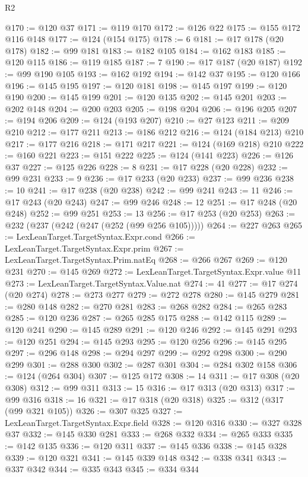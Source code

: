 \begin{lexlean}{R2}
\begin{coremodule}
@170 := @120 @37
@171 := @119 @170
@172 := @126 @22
@175 := @155 @172 @116 @148
@177 := @124 (@154 @175)
@178 := 6
@181 := @17 @178 (@20 @178)
@182 := @99 @181
@183 := @182 @105
@184 := @162 @183
@185 := @120 @115
@186 := @119 @185
@187 := 7
@190 := @17 @187 (@20 @187)
@192 := @99 @190 @105
@193 := @162 @192
@194 := @142 @37
@195 := @120 @166
@196 := @145 @195
@197 := @120 @181
@198 := @145 @197
@199 := @120 @190
@200 := @145 @199
@201 := @120 @135
@202 := @145 @201
@203 := @202 @148
@204 := @200 @203
@205 := @198 @204
@206 := @196 @205
@207 := @194 @206
@209 := @124 (@193 @207)
@210 := @27 @123
@211 := @209 @210
@212 := @177 @211
@213 := @186 @212
@216 := @124 (@184 @213) @210
@217 := @177 @216
@218 := @171 @217
@221 := @124 (@169 @218) @210
@222 := @160 @221
@223 := @151 @222
@225 := @124 (@141 @223)
@226 := @126 @37
@227 := @125 @226
@228 := 8
@231 := @17 @228 (@20 @228)
@232 := @99 @231
@233 := 9
@236 := @17 @233 (@20 @233)
@237 := @99 @236
@238 := 10
@241 := @17 @238 (@20 @238)
@242 := @99 @241
@243 := 11
@246 := @17 @243 (@20 @243)
@247 := @99 @246
@248 := 12
@251 := @17 @248 (@20 @248)
@252 := @99 @251
@253 := 13
@256 := @17 @253 (@20 @253)
@263 := @232 (@237 (@242 (@247 (@252 (@99 @256 @105)))))
@264 := @227 @263
@265 := LexLeanTarget.TargetSyntax.Expr.cond
@266 := LexLeanTarget.TargetSyntax.Expr.prim
@267 := LexLeanTarget.TargetSyntax.Prim.natEq
@268 := @266 @267
@269 := @120 @231
@270 := @145 @269
@272 := LexLeanTarget.TargetSyntax.Expr.value @11
@273 := LexLeanTarget.TargetSyntax.Value.nat
@274 := 41
@277 := @17 @274 (@20 @274)
@278 := @273 @277
@279 := @272 @278
@280 := @145 @279
@281 := @280 @148
@282 := @270 @281
@283 := @268 @282
@284 := @265 @283
@285 := @120 @236
@287 := @265 @285 @175
@288 := @142 @115
@289 := @120 @241
@290 := @145 @289
@291 := @120 @246
@292 := @145 @291
@293 := @120 @251
@294 := @145 @293
@295 := @120 @256
@296 := @145 @295
@297 := @296 @148
@298 := @294 @297
@299 := @292 @298
@300 := @290 @299
@301 := @288 @300
@302 := @287 @301
@304 := @284 @302 @158
@306 := @124 (@264 @304)
@307 := @125 @172
@308 := 14
@311 := @17 @308 (@20 @308)
@312 := @99 @311
@313 := 15
@316 := @17 @313 (@20 @313)
@317 := @99 @316
@318 := 16
@321 := @17 @318 (@20 @318)
@325 := @312 (@317 (@99 @321 @105))
@326 := @307 @325
@327 := LexLeanTarget.TargetSyntax.Expr.field
@328 := @120 @316
@330 := @327 @328 @37
@332 := @145 @330 @281
@333 := @268 @332
@334 := @265 @333
@335 := @142 @135
@336 := @120 @311
@337 := @145 @336
@338 := @145 @328
@339 := @120 @321
@341 := @145 @339 @148
@342 := @338 @341
@343 := @337 @342
@344 := @335 @343
@345 := @334 @344

\end{coremodule}
\end{lexlean}

